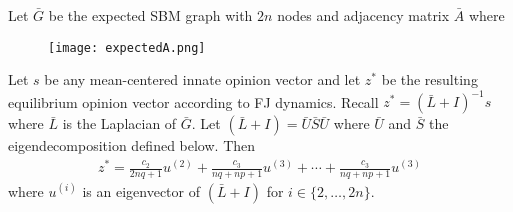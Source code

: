 \begin{theorem}\label{thm:expectz}
Let $\bar{G}$ be the expected SBM graph with $2n$ nodes
and adjacency matrix $\bar{A}$ where

\begin{figure}[h]
    \centering
    \texttt{[image: expectedA.png]}
\end{figure}

Let $s$ be any mean-centered innate opinion vector
and let $z^*$ be the resulting equilibrium opinion
vector according to FJ dynamics.
Recall $z^* = (\bar{L}+I)^{-1}s$ where $\bar{L}$
is the Laplacian of $\bar{G}$.
Let $(\bar{L}+I)=\bar{U}\bar{S}\bar{U}$ where
$\bar{U}$ and $\bar{S}$ the eigendecomposition defined below.
Then
\begin{align}
    z^* = \frac{c_2}{2nq + 1} u^{(2)}
    + \frac{c_3}{nq +np + 1} u^{(3)}
    + \cdots + \frac{c_3}{nq +np + 1}u^{(3)} \nonumber
\end{align}
where $u^{(i)}$ is an eigenvector of $(\bar{L}+I)$ for
$i \in \{2, \ldots, 2n\}$.

\end{theorem}
